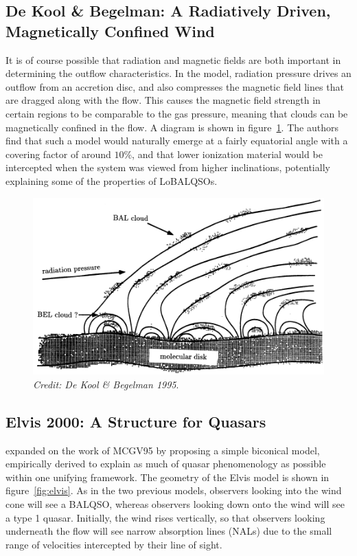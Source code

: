 \subsection{De Kool \& Begelman: A Radiatively Driven, Magnetically Confined Wind}

It is of course possible that radiation and magnetic fields are both important
in determining the outflow characteristics. In the \cite{dekool1995} model, radiation
pressure drives an outflow from an accretion disc, and also compresses the magnetic
field lines that are dragged along with the flow. This causes the magnetic field
strength in certain regions to be comparable to the gas pressure, meaning that clouds
can be magnetically confined in the flow. A diagram is shown in figure~\ref{fig:dekool}.
The authors find that such a model would naturally emerge at a fairly equatorial
angle with a covering factor of around $10\%$, and that lower ionization material 
would be intercepted when the system was viewed from higher inclinations, potentially
explaining some of the properties of LoBALQSOs.

\begin{figure}
\centering
\includegraphics[width=1.0\textwidth]{figures/02-outflows/dekool.png}
\caption
{
{\sl Credit: De Kool \& Begelman 1995}. 
} 
\label{fig:dekool}
\end{figure}


\subsection{Elvis 2000: A Structure for Quasars}

\cite{elvis2000} expanded on the work of MCGV95 by proposing a simple
biconical model, empirically derived to explain as much of quasar phenomenology
as possible within one unifying framework. The geometry of the Elvis model
is shown in figure~\ref{fig:elvis}. As in the two previous models, observers 
looking into the wind cone will see a BALQSO, whereas observers looking down onto
the wind will see a type 1 quasar. Initially, the wind rises vertically, so
that observers looking underneath the flow will see narrow absorption lines (NALs)
due to the small range of velocities intercepted by their line of sight. 

